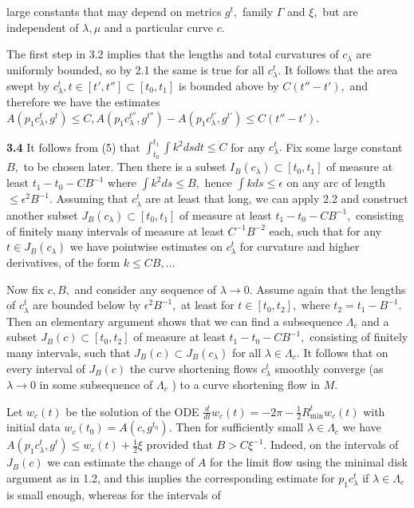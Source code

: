 \documentclass{article}
\newcommand{\e}{\epsilon}
\newcommand{\la}{\lambda}
\newcommand{\G}{\Gamma}
\begin{document}
large constants that may depend on metrics $g^t,$ family $\G$ and
$\xi,$ but are independent of $\la ,\mu $ and a particular curve
$c.$
\par The first step in 3.2 implies that the lengths and total
curvatures of $c_{\la}$ are uniformly bounded, so by 2.1 the same
is true for all $c^t_{\la}.$ It follows that the area swept by
$c^t_{\la}, t\in [t',t'']\subset [t_0,t_1]$ is bounded above by
$C(t''-t'),$ and therefore we have the estimates
$A(p_1c^t_{\la},g^t)\le C,
A(p_1c^{t''}_{\la},g^{t''})-A(p_1c^{t'}_{\la},g^{t'})\le
C(t''-t').$
\par {\bf 3.4} It follows from (5) that $\int_{t_0}^{t_1} \int k^2
dsdt \le C$ for any $c^t_{\la}.$ Fix some large constant $B,$ to
be chosen later. Then there is a subset $I_B(c_{\la})\subset
[t_0,t_1]$ of measure at least $t_1-t_0-CB^{-1}$ where $\int k^2
ds\le B,$ hence $\int kds \le \e$ on any arc of length $\le \e^2
B^{-1}.$ Assuming that $c^t_{\la}$ are at least that long, we can
apply 2.2 and construct another subset $J_B(c_{\la})\subset
[t_0,t_1]$ of measure at least $t_1-t_0-CB^{-1},$ consisting of
finitely many intervals of measure at least $C^{-1}B^{-2}$ each,
such that for any $t\in J_B(c_{\la})$ we have pointwise estimates
on $c^t_{\la}$ for curvature and higher derivatives, of the form
$k\le CB,...$
\par Now fix $c, B,$ and consider any sequence of $\la\to 0.$
Assume again that the lengths of $c^t_{\la}$ are bounded below by
$\e^2 B^{-1},$ at least for $t\in [t_0,t_2],$ where
$t_2=t_1-B^{-1}.$ Then an elementary argument shows that we can
find a subsequence $\Lambda_c$ and a subset $J_B(c)\subset
[t_0,t_2]$ of measure at least $t_1-t_0-CB^{-1},$ consisting of
finitely many intervals, such that $J_B(c)\subset J_B(c_{\la})$
for all $\la\in \Lambda_c.$ It follows that on every interval of
$J_B(c)$ the curve shortening flows $c^t_{\la}$ smoothly converge
(as $\la\to 0$ in some subsequence of $\Lambda_c$ )  to a curve
shortening flow in $M.$
\par Let $w_c(t)$ be the solution of the ODE
$\frac{d}{dt}w_c(t)=-2\pi-\frac{1}{2}R^t_{\mathrm{min}}w_c(t)$
with initial data $w_c(t_0)=A(c,g^{t_0}).$ Then for sufficiently
small $\la\in\Lambda_c$ we have $A(p_1c^t_{\la},g^t)\le
w_c(t)+\frac{1}{2}\xi$ provided that $B>C\xi^{-1}.$ Indeed, on the
intervals of $J_B(c)$ we can estimate the change of $A$ for the
limit flow using the minimal disk argument as in 1.2, and this
implies the corresponding estimate for $p_1c^t_{\la}$ if
$\la\in\Lambda_c$ is small enough, whereas for the intervals of
\end{document}
